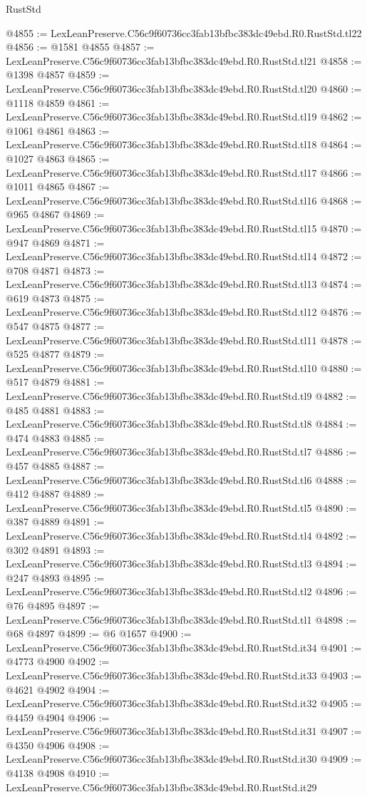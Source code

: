 \begin{lexlean}{RustStd}
\begin{coremodule}
@4855 := LexLeanPreserve.C56c9f60736cc3fab13bfbc383dc49ebd.R0.RustStd.tl22
@4856 := @1581 @4855
@4857 := LexLeanPreserve.C56c9f60736cc3fab13bfbc383dc49ebd.R0.RustStd.tl21
@4858 := @1398 @4857
@4859 := LexLeanPreserve.C56c9f60736cc3fab13bfbc383dc49ebd.R0.RustStd.tl20
@4860 := @1118 @4859
@4861 := LexLeanPreserve.C56c9f60736cc3fab13bfbc383dc49ebd.R0.RustStd.tl19
@4862 := @1061 @4861
@4863 := LexLeanPreserve.C56c9f60736cc3fab13bfbc383dc49ebd.R0.RustStd.tl18
@4864 := @1027 @4863
@4865 := LexLeanPreserve.C56c9f60736cc3fab13bfbc383dc49ebd.R0.RustStd.tl17
@4866 := @1011 @4865
@4867 := LexLeanPreserve.C56c9f60736cc3fab13bfbc383dc49ebd.R0.RustStd.tl16
@4868 := @965 @4867
@4869 := LexLeanPreserve.C56c9f60736cc3fab13bfbc383dc49ebd.R0.RustStd.tl15
@4870 := @947 @4869
@4871 := LexLeanPreserve.C56c9f60736cc3fab13bfbc383dc49ebd.R0.RustStd.tl14
@4872 := @708 @4871
@4873 := LexLeanPreserve.C56c9f60736cc3fab13bfbc383dc49ebd.R0.RustStd.tl13
@4874 := @619 @4873
@4875 := LexLeanPreserve.C56c9f60736cc3fab13bfbc383dc49ebd.R0.RustStd.tl12
@4876 := @547 @4875
@4877 := LexLeanPreserve.C56c9f60736cc3fab13bfbc383dc49ebd.R0.RustStd.tl11
@4878 := @525 @4877
@4879 := LexLeanPreserve.C56c9f60736cc3fab13bfbc383dc49ebd.R0.RustStd.tl10
@4880 := @517 @4879
@4881 := LexLeanPreserve.C56c9f60736cc3fab13bfbc383dc49ebd.R0.RustStd.tl9
@4882 := @485 @4881
@4883 := LexLeanPreserve.C56c9f60736cc3fab13bfbc383dc49ebd.R0.RustStd.tl8
@4884 := @474 @4883
@4885 := LexLeanPreserve.C56c9f60736cc3fab13bfbc383dc49ebd.R0.RustStd.tl7
@4886 := @457 @4885
@4887 := LexLeanPreserve.C56c9f60736cc3fab13bfbc383dc49ebd.R0.RustStd.tl6
@4888 := @412 @4887
@4889 := LexLeanPreserve.C56c9f60736cc3fab13bfbc383dc49ebd.R0.RustStd.tl5
@4890 := @387 @4889
@4891 := LexLeanPreserve.C56c9f60736cc3fab13bfbc383dc49ebd.R0.RustStd.tl4
@4892 := @302 @4891
@4893 := LexLeanPreserve.C56c9f60736cc3fab13bfbc383dc49ebd.R0.RustStd.tl3
@4894 := @247 @4893
@4895 := LexLeanPreserve.C56c9f60736cc3fab13bfbc383dc49ebd.R0.RustStd.tl2
@4896 := @76 @4895
@4897 := LexLeanPreserve.C56c9f60736cc3fab13bfbc383dc49ebd.R0.RustStd.tl1
@4898 := @68 @4897
@4899 := @6 @1657
@4900 := LexLeanPreserve.C56c9f60736cc3fab13bfbc383dc49ebd.R0.RustStd.it34
@4901 := @4773 @4900
@4902 := LexLeanPreserve.C56c9f60736cc3fab13bfbc383dc49ebd.R0.RustStd.it33
@4903 := @4621 @4902
@4904 := LexLeanPreserve.C56c9f60736cc3fab13bfbc383dc49ebd.R0.RustStd.it32
@4905 := @4459 @4904
@4906 := LexLeanPreserve.C56c9f60736cc3fab13bfbc383dc49ebd.R0.RustStd.it31
@4907 := @4350 @4906
@4908 := LexLeanPreserve.C56c9f60736cc3fab13bfbc383dc49ebd.R0.RustStd.it30
@4909 := @4138 @4908
@4910 := LexLeanPreserve.C56c9f60736cc3fab13bfbc383dc49ebd.R0.RustStd.it29

\end{coremodule}
\end{lexlean}
